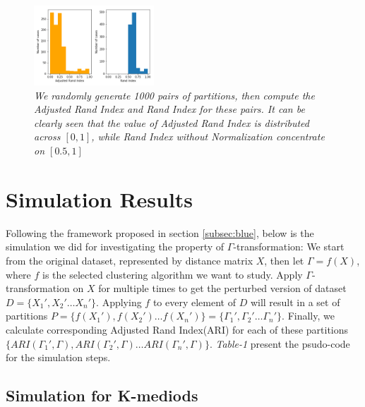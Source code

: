 \documentclass{uonmathreport}
\begin{document}
\begin{figure}[H]
 \begin{center}
   \includegraphics[width=0.4\textwidth]{adjusted.png}
 \end{center}
 \caption{\textit{We randomly generate 1000 pairs of partitions, then compute the Adjusted Rand Index and Rand Index for these pairs. It can be clearly seen that the value of Adjusted Rand Index is distributed across $[0,1]$, while Rand Index without Normalization concentrate on $[0.5,1]$}}
 \label{fig:bsd}
\end{figure}


\section{Simulation Results} \label{sec:red}
Following the framework proposed in section \ref{subsec:blue}, below is the simulation we did for investigating the property of $\Gamma$-transformation: We start from the original dataset, represented by distance matrix $X$, then let $\Gamma = f(X)$, where $f$ is the selected clustering algorithm we want to study. Apply $\Gamma$-transformation on $X$ for multiple times to get the perturbed version of dataset $D = \{X_1',X_2'\ldots X_n'\}$. Applying $f$ to every element of $D$ will result in a set of partitions $P = \{f(X_1'),f(X_2')\ldots f(X_n')\}=\{\Gamma_1',\Gamma_2' \ldots \Gamma_n' \}$. Finally, we calculate corresponding Adjusted Rand Index(ARI) for each of these partitions $\{ARI(\Gamma_1',\Gamma),ARI(\Gamma_2',\Gamma)\ldots ARI(\Gamma_n',\Gamma)\}$. \textit{Table-1} present the psudo-code for the simulation steps.
\subsection{Simulation for K-mediods} \label{subsec: kmediods}
\end{document}
